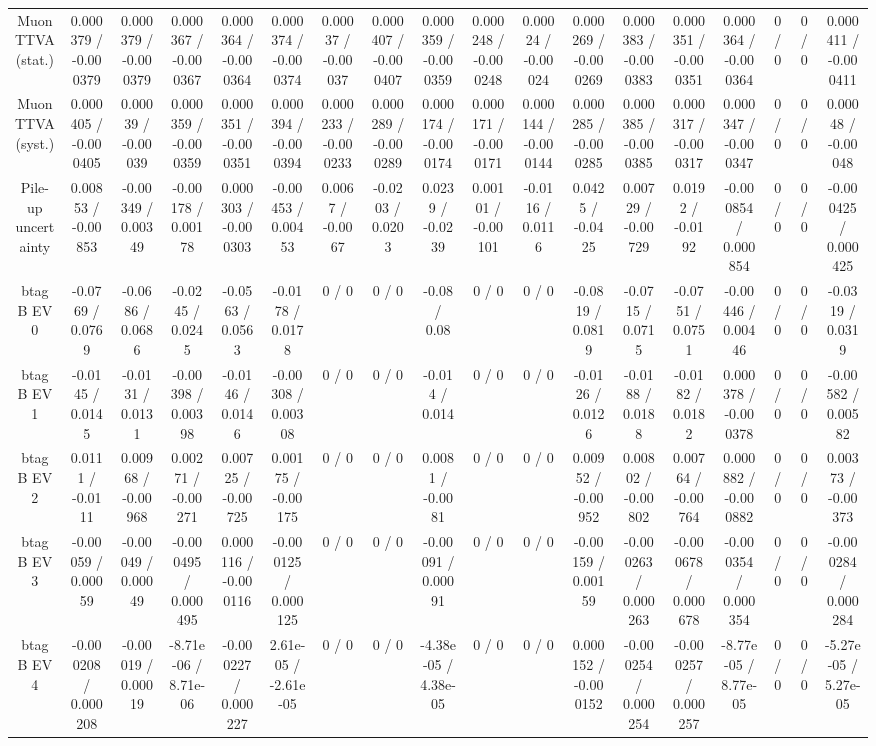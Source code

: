 \documentclass[10pt]{article}
\begin{document}
\begin{table}[htbp]
\begin{center}
\begin{tabular}{|c|c|c|c|c|c|c|c|c|c|c|c|c|c|c|c|c|c|}
  Muon TTVA (stat.) & 0.000379 / -0.000379 & 0.000379 / -0.000379 & 0.000367 / -0.000367 & 0.000364 / -0.000364 & 0.000374 / -0.000374 & 0.00037 / -0.00037 & 0.000407 / -0.000407 & 0.000359 / -0.000359 & 0.000248 / -0.000248 & 0.00024 / -0.00024 & 0.000269 / -0.000269 & 0.000383 / -0.000383 & 0.000351 / -0.000351 & 0.000364 / -0.000364 & 0 / 0 & 0 / 0 & 0.000411 / -0.000411 \\ 
  Muon TTVA (syst.) & 0.000405 / -0.000405 & 0.00039 / -0.00039 & 0.000359 / -0.000359 & 0.000351 / -0.000351 & 0.000394 / -0.000394 & 0.000233 / -0.000233 & 0.000289 / -0.000289 & 0.000174 / -0.000174 & 0.000171 / -0.000171 & 0.000144 / -0.000144 & 0.000285 / -0.000285 & 0.000385 / -0.000385 & 0.000317 / -0.000317 & 0.000347 / -0.000347 & 0 / 0 & 0 / 0 & 0.00048 / -0.00048 \\ 
  Pile-up uncertainty & 0.00853 / -0.00853 & -0.00349 / 0.00349 & -0.00178 / 0.00178 & 0.000303 / -0.000303 & -0.00453 / 0.00453 & 0.0067 / -0.0067 & -0.0203 / 0.0203 & 0.0239 / -0.0239 & 0.00101 / -0.00101 & -0.0116 / 0.0116 & 0.0425 / -0.0425 & 0.00729 / -0.00729 & 0.0192 / -0.0192 & -0.000854 / 0.000854 & 0 / 0 & 0 / 0 & -0.000425 / 0.000425 \\ 
  btag B EV 0 & -0.0769 / 0.0769 & -0.0686 / 0.0686 & -0.0245 / 0.0245 & -0.0563 / 0.0563 & -0.0178 / 0.0178 & 0 / 0 & 0 / 0 & -0.08 / 0.08 & 0 / 0 & 0 / 0 & -0.0819 / 0.0819 & -0.0715 / 0.0715 & -0.0751 / 0.0751 & -0.00446 / 0.00446 & 0 / 0 & 0 / 0 & -0.0319 / 0.0319 \\ 
  btag B EV 1 & -0.0145 / 0.0145 & -0.0131 / 0.0131 & -0.00398 / 0.00398 & -0.0146 / 0.0146 & -0.00308 / 0.00308 & 0 / 0 & 0 / 0 & -0.014 / 0.014 & 0 / 0 & 0 / 0 & -0.0126 / 0.0126 & -0.0188 / 0.0188 & -0.0182 / 0.0182 & 0.000378 / -0.000378 & 0 / 0 & 0 / 0 & -0.00582 / 0.00582 \\ 
  btag B EV 2 & 0.0111 / -0.0111 & 0.00968 / -0.00968 & 0.00271 / -0.00271 & 0.00725 / -0.00725 & 0.00175 / -0.00175 & 0 / 0 & 0 / 0 & 0.0081 / -0.0081 & 0 / 0 & 0 / 0 & 0.00952 / -0.00952 & 0.00802 / -0.00802 & 0.00764 / -0.00764 & 0.000882 / -0.000882 & 0 / 0 & 0 / 0 & 0.00373 / -0.00373 \\ 
  btag B EV 3 & -0.00059 / 0.00059 & -0.00049 / 0.00049 & -0.000495 / 0.000495 & 0.000116 / -0.000116 & -0.000125 / 0.000125 & 0 / 0 & 0 / 0 & -0.00091 / 0.00091 & 0 / 0 & 0 / 0 & -0.00159 / 0.00159 & -0.000263 / 0.000263 & -0.000678 / 0.000678 & -0.000354 / 0.000354 & 0 / 0 & 0 / 0 & -0.000284 / 0.000284 \\ 
  btag B EV 4 & -0.000208 / 0.000208 & -0.00019 / 0.00019 & -8.71e-06 / 8.71e-06 & -0.000227 / 0.000227 & 2.61e-05 / -2.61e-05 & 0 / 0 & 0 / 0 & -4.38e-05 / 4.38e-05 & 0 / 0 & 0 / 0 & 0.000152 / -0.000152 & -0.000254 / 0.000254 & -0.000257 / 0.000257 & -8.77e-05 / 8.77e-05 & 0 / 0 & 0 / 0 & -5.27e-05 / 5.27e-05 \\ 

\end{tabular}
\end{center}
\end{table}
\end{document}

